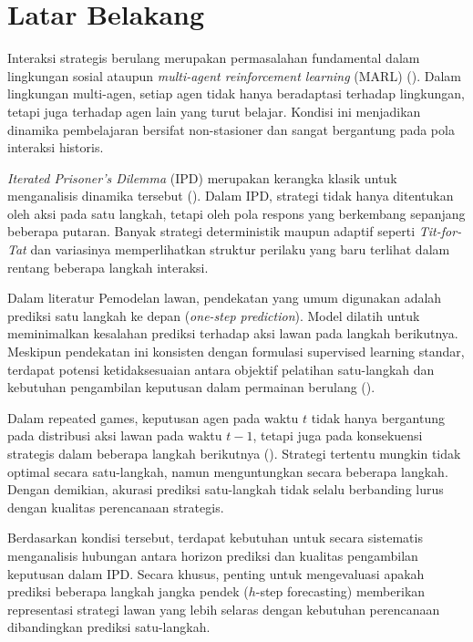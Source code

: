 \section{Latar Belakang}

Interaksi strategis berulang merupakan permasalahan fundamental dalam lingkungan sosial ataupun \textit{multi-agent reinforcement learning} (MARL) (\cite{hernandez-leal_survey_2019}). Dalam lingkungan multi-agen, setiap agen tidak hanya beradaptasi terhadap lingkungan, tetapi juga terhadap agen lain yang turut belajar. Kondisi ini menjadikan dinamika pembelajaran bersifat non-stasioner dan sangat bergantung pada pola interaksi historis.

\textit{Iterated Prisoner's Dilemma} (IPD) merupakan kerangka klasik untuk menganalisis dinamika tersebut (\cite{axelrod_evolution_1981}). Dalam IPD, strategi tidak hanya ditentukan oleh aksi pada satu langkah, tetapi oleh pola respons yang berkembang sepanjang beberapa putaran. Banyak strategi deterministik maupun adaptif seperti \textit{Tit-for-Tat} dan variasinya memperlihatkan struktur perilaku yang baru terlihat dalam rentang beberapa langkah interaksi.

Dalam literatur Pemodelan lawan, pendekatan yang umum digunakan adalah prediksi satu langkah ke depan (\textit{one-step prediction}). Model dilatih untuk meminimalkan kesalahan prediksi terhadap aksi lawan pada langkah berikutnya. Meskipun pendekatan ini konsisten dengan formulasi supervised learning standar, terdapat potensi ketidaksesuaian antara objektif pelatihan satu-langkah dan kebutuhan pengambilan keputusan dalam permainan berulang (\cite{nashed_survey_2022}).

Dalam repeated games, keputusan agen pada waktu $t$ tidak hanya bergantung pada distribusi aksi lawan pada waktu $t-1$, tetapi juga pada konsekuensi strategis dalam beberapa langkah berikutnya (\cite{nashed_survey_2022}). Strategi tertentu mungkin tidak optimal secara satu-langkah, namun menguntungkan secara beberapa langkah. Dengan demikian, akurasi prediksi satu-langkah tidak selalu berbanding lurus dengan kualitas perencanaan strategis.

Berdasarkan kondisi tersebut, terdapat kebutuhan untuk secara sistematis menganalisis hubungan antara horizon prediksi dan kualitas pengambilan keputusan dalam IPD. Secara khusus, penting untuk mengevaluasi apakah prediksi beberapa langkah jangka pendek ($h$-step forecasting) memberikan representasi strategi lawan yang lebih selaras dengan kebutuhan perencanaan dibandingkan prediksi satu-langkah.

